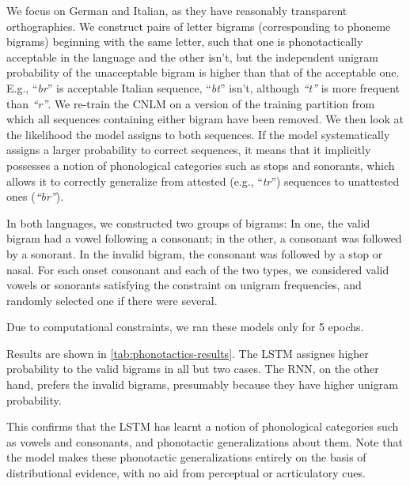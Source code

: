 We focus on German and Italian, as they have reasonably transparent orthographies.
We construct pairs of letter bigrams (corresponding to phoneme
bigrams) beginning with the same letter, such that one is
phonotactically acceptable in the language and the other isn't, but
the independent unigram probability of the unacceptable bigram is
higher than that of the acceptable one. E.g., ``\emph{br}'' is
acceptable Italian sequence, ``\emph{bt}'' isn't, although
\emph{``t''} is more frequent than \emph{``r''}. We re-train the CNLM on a version of
the training partition from which all sequences containing either bigram have been removed. We then look at
the likelihood the model assigns to both sequences. If the model systematically
assigns a larger probability to correct sequences, it means that it
implicitly possesses a notion of phonological categories such as
stops and sonorants, which allows it to correctly generalize from
attested (e.g., ``\emph{tr}'') sequences to unattested ones
(\emph{``br''}).


In both languages, we constructed two groups of bigrams:
In one, the valid bigram had a vowel following a consonant; in the other, a consonant was followed by a sonorant.
In the invalid bigram, the consonant was followed by a stop or nasal.
For each onset consonant and each of the two types, we considered valid vowels or sonorants satisfying the constraint on unigram frequencies, and randomly selected one if there were several.


Due to computational constraints, we ran these models only for 5 epochs.

Results are shown in \ref{tab:phonotactics-results}.
The LSTM assignes higher probability to the valid bigrams in all but two cases.
The RNN, on the other hand, prefers the invalid bigrams, presumably because they have higher unigram probability.

This confirms that the LSTM has learnt a notion of phonological categories such as vowels and consonants, and phonotactic generalizations about them.
Note that the model makes these phonotactic generalizations entirely on the basis of distributional evidence, with no aid from perceptual or acrticulatory cues.



